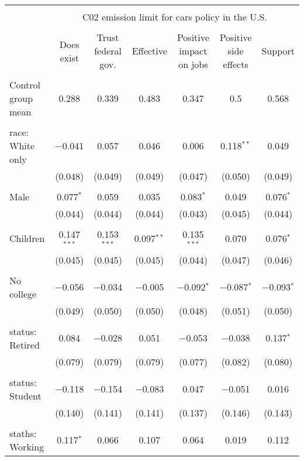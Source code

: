 
\begin{tabular}{@{\extracolsep{5pt}}lcccccc} 
\\[-1.8ex]\hline 
\hline \\[-1.8ex] 
 & \multicolumn{6}{c}{C02 emission limit for cars policy in the U.S.} \\ 
\cline{2-7} 
\\[-1.8ex] & Does exist & Trust federal gov. & Effective & Positive impact on jobs & Positive side effects & Support \\ 
\hline \\[-1.8ex] 
 Control group mean & 0.288 & 0.339 & 0.483 & 0.347 & 0.5 & 0.568  \\ \hline \\[-1.8ex] race: White only & $-$0.041 & 0.057 & 0.046 & 0.006 & 0.118$^{**}$ & 0.049 \\ 
  & (0.048) & (0.049) & (0.049) & (0.047) & (0.050) & (0.049) \\ 
  & & & & & & \\ 
 Male & 0.077$^{*}$ & 0.059 & 0.035 & 0.083$^{*}$ & 0.049 & 0.076$^{*}$ \\ 
  & (0.044) & (0.044) & (0.044) & (0.043) & (0.045) & (0.044) \\ 
  & & & & & & \\ 
 Children & 0.147$^{***}$ & 0.153$^{***}$ & 0.097$^{**}$ & 0.135$^{***}$ & 0.070 & 0.076$^{*}$ \\ 
  & (0.045) & (0.045) & (0.045) & (0.044) & (0.047) & (0.046) \\ 
  & & & & & & \\ 
 No college & $-$0.056 & $-$0.034 & $-$0.005 & $-$0.092$^{*}$ & $-$0.087$^{*}$ & $-$0.093$^{*}$ \\ 
  & (0.049) & (0.050) & (0.050) & (0.048) & (0.051) & (0.050) \\ 
  & & & & & & \\ 
 status: Retired & 0.084 & $-$0.028 & 0.051 & $-$0.053 & $-$0.038 & 0.137$^{*}$ \\ 
  & (0.079) & (0.079) & (0.079) & (0.077) & (0.082) & (0.080) \\ 
  & & & & & & \\ 
 status: Student & $-$0.118 & $-$0.154 & $-$0.083 & 0.047 & $-$0.051 & 0.016 \\ 
  & (0.140) & (0.141) & (0.141) & (0.137) & (0.146) & (0.143) \\ 
  & & & & & & \\ 
 staths: Working & 0.117$^{*}$ & 0.066 & 0.107 & 0.064 & 0.019 & 0.112 \\ 

\end{tabular}
